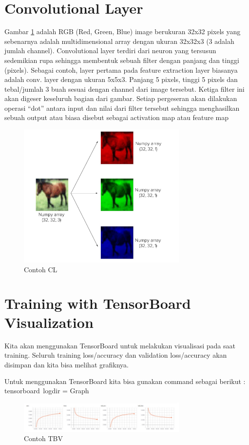 \section{Convolutional Layer}
 Gambar \ref{labelgambar2} adalah RGB (Red, Green, Blue) image berukuran 32x32 pixels yang sebenarnya adalah multidimensional array dengan ukuran 32x32x3 (3 adalah jumlah channel).
Convolutional layer terdiri dari neuron yang tersusun sedemikian rupa sehingga membentuk sebuah filter dengan panjang dan tinggi (pixels). Sebagai contoh, layer pertama pada feature extraction layer biasanya adalah conv. layer dengan ukuran 5x5x3. Panjang 5 pixels, tinggi 5 pixels dan tebal/jumlah 3 buah sesuai dengan channel dari image tersebut.
Ketiga filter ini akan digeser keseluruh bagian dari gambar. Setiap pergeseran akan dilakukan operasi “dot” antara input dan nilai dari filter tersebut sehingga menghasilkan sebuah output atau biasa disebut sebagai activation map atau feature map

\begin{figure}[!htp]
	\includegraphics[width=0.75\textwidth]{figures/ConvolutionalLayer.PNG}
	\caption{Contoh CL}
	\label{labelgambar2}
\end{figure}



\section{Training with TensorBoard Visualization}
Kita akan menggunakan TensorBoard untuk melakukan visualisasi pada saat training. Seluruh training loss/accuracy dan validation loss/accuracy akan disimpan dan kita bisa melihat grafiknya.

Untuk menggunakan TensorBoard kita bisa gunakan command sebagai berikut :
tensorboard   logdir = Graph
\begin{figure}[!htp]
	\includegraphics[width=0.75\textwidth]{figures/TensorBoardVisualization.PNG}
	\caption{Contoh TBV}
	\label{labelgambar3}
\end{figure}

